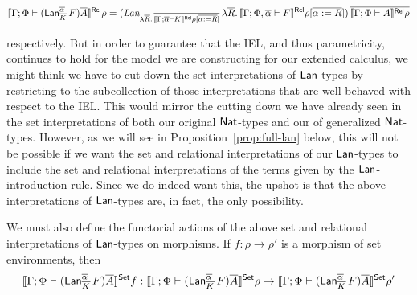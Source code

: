 \documentclass{lmcs}
\theoremstyle{plain}\newtheorem{satz}[thm]{Satz}
\begin{document}
\vspace*{-0.1in}

\[
  \llbracket{\Gamma;\Phi \vdash
    (\mathsf{Lan}^{\overline{\alpha}}_{\overline{K}}\,F)\overline{A}}\rrbracket^{\mathsf{Rel}}\rho = (
  \textit{Lan}_{\lambda \overline{R}.\,\overline{\llbracket{\Gamma; \overline{\alpha} \vdash
        K}\rrbracket^{\mathsf{Rel}}\rho[\overline{\alpha := R}]}}\, \lambda \overline{R}.\,\llbracket{\Gamma;
    \Phi, \overline{\alpha} \vdash F}\rrbracket^{\mathsf{Rel}}\rho[\overline{\alpha := R}])\,
  \overline{\llbracket{\Gamma; \Phi \vdash A}\rrbracket^{\mathsf{Rel}}\rho}
\]

\vspace*{0.05in}

\noindent
respectively. But in order to guarantee that the IEL, and thus
parametricity, continues to hold for the model we are constructing for
our extended calculus, we might think we have to cut down the set
interpretations of $\mathsf{Lan}$-types by restricting to the subcollection of
those interpretations that are well-behaved with respect to the
IEL. This would mirror the cutting down we have already seen in the
set interpretations of both our original $\mathsf{Nat}$-types and our of
generalized $\mathsf{Nat}$-types. However, as we will see in
Proposition~\ref{prop:full-lan} below, this will not be possible if we
want the set and relational interpretations of our $\mathsf{Lan}$-types to
include the set and relational interpretations of the terms given by
the $\mathsf{Lan}$-introduction rule. Since we do indeed want this, the upshot
is that the above interpretations of $\mathsf{Lan}$-types are, in fact, the
only possibility.

We must also define the functorial actions of the above set and
relational interpretations of $\mathsf{Lan}$-types on morphisms. If $f : \rho
\to \rho'$ is a morphism of set environments, then
\[
\llbracket{\Gamma;\Phi \vdash (\mathsf{Lan}^{\overline{\alpha}}_{\overline{K}}\,F)\overline{A}}\rrbracket^{\mathsf{Set}}f
: \llbracket{\Gamma;\Phi \vdash (\mathsf{Lan}^{\overline{\alpha}}_{\overline{K}}\,F)\overline{A}}\rrbracket^{\mathsf{Set}}\rho
\to \llbracket{\Gamma;\Phi \vdash (\mathsf{Lan}^{\overline{\alpha}}_{\overline{K}}\,F)\overline{A}}\rrbracket^{\mathsf{Set}}\rho'
\]

\vspace*{0.05in}
\end{document}
